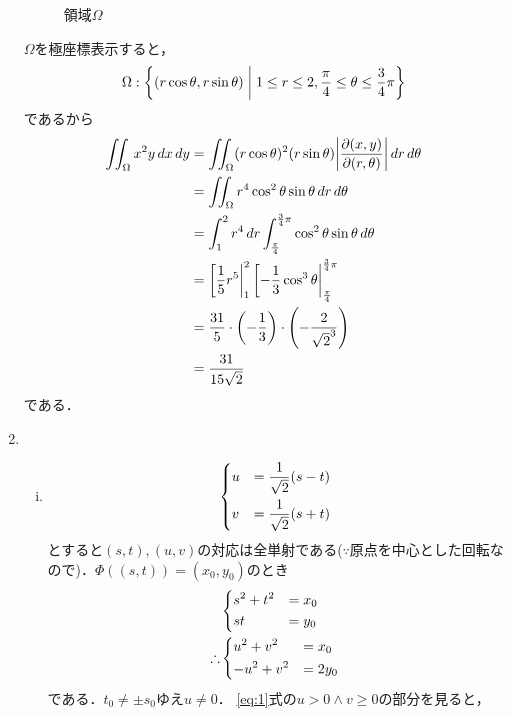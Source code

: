 \begin{enumerate}[(1)]
\begin{figure}[H]
        \caption{領域$\Omega$}
        \label{fig:Omega}
    \end{figure}
    $\Omega$を極座標表示すると，
    \begin{equation}
        \Omega : \qty{ \qty( r\cos \theta, r \sin \theta ) \mathrel{}\middle|\mathrel{}1\le r \le 2, \frac{\pi}{4}\le \theta \le \frac{3}{4}\pi}
    \end{equation}
    であるから
    \begin{align}
        \iint_\Omega x^2y\dd{x}\dd{y}
        &= \iint_\Omega (r\cos \theta)^2(r \sin \theta)\abs{\Jacobi{x,y}{r,\theta}} \dd{r}\dd{\theta}\\
        &= \iint_\Omega r^4\cos^2 \theta\sin \theta\dd{r}\dd{\theta}\\
        &= \int^2_1 r^4\dd{r}\int^{\frac{3}{4}\pi}_{\frac{\pi}{4}} \cos^2 \theta\sin \theta\dd{\theta}\\
        &= \eval[\frac{1}{5}r^5|^{2}_{1} \eval[-\frac{1}{3}\cos^3 \theta |^{\frac{3}{4}\pi}_{\frac{\pi}{4}}\\
        &= \frac{31}{5}\cdot \qty(-\frac{1}{3})\cdot\qty(-\frac{2}{\sqrt{2}^3})\\
        &= \frac{31}{15\sqrt{2}}
    \end{align}
    である．
    \item 
    \begin{enumerate}[(i)]
        \item 
        \begin{equation}
            \begin{dcases}
                u&=\frac{1}{\sqrt{2}}(s-t)\\
                v&=\frac{1}{\sqrt{2}}(s+t)
            \end{dcases}
        \end{equation}
        とすると$(s,t),(u,v)$の対応は全単射である($\because$原点を中心とした回転なので)．$\Phi((s,t))=(x_0,y_0)$のとき
        \begin{align}
            &\begin{dcases}
                s^2+t^2&=x_0\\
                st&=y_0
            \end{dcases}\\
            \therefore
            &\begin{dcases}
                u^2+v^2&=x_0\\
                -u^2+v^2&=2y_0
            \end{dcases}\label{eq:1}
        \end{align}
        である．$t_0\ne\pm s_0$ゆえ$u\ne 0$．
        \eqref{eq:1}式の$u> 0\land v\ge 0$の部分を見ると，


\end{enumerate}
\end{enumerate}
